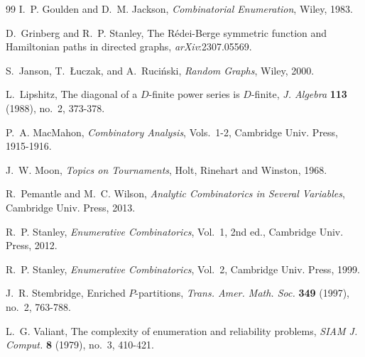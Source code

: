 \documentclass[12pt]{amsart}
\theoremstyle{definition}
\theoremstyle{remark}
\begin{document}
\begin{thebibliography}{99}
I.~P. Goulden and D.~M. Jackson,
\emph{Combinatorial Enumeration},
Wiley, 1983.

D.~Grinberg and R.~P. Stanley,
The R\'edei-Berge symmetric function and Hamiltonian paths in directed graphs,
\emph{arXiv}:2307.05569.

S.~Janson, T.~{\L}uczak, and A.~Ruci\'nski,
\emph{Random Graphs},
Wiley, 2000.

L.~Lipshitz,
The diagonal of a $D$-finite power series is $D$-finite,
\emph{J. Algebra} \textbf{113} (1988), no.~2, 373-378.

P.~A. MacMahon,
\emph{Combinatory Analysis}, Vols.~1-2,
Cambridge Univ. Press, 1915-1916.

J.~W. Moon,
\emph{Topics on Tournaments},
Holt, Rinehart and Winston, 1968.

R.~Pemantle and M.~C. Wilson,
\emph{Analytic Combinatorics in Several Variables},
Cambridge Univ. Press, 2013.

R.~P. Stanley,
\emph{Enumerative Combinatorics}, Vol.~1, 2nd ed.,
Cambridge Univ. Press, 2012.


R.~P. Stanley,
\emph{Enumerative Combinatorics}, Vol.~2,
Cambridge Univ. Press, 1999.

J.~R. Stembridge,
Enriched $P$-partitions,
\emph{Trans. Amer. Math. Soc.} \textbf{349} (1997), no.~2, 763-788.

L.~G. Valiant,
The complexity of enumeration and reliability problems,
\emph{SIAM J. Comput.} \textbf{8} (1979), no.~3, 410-421.

\end{thebibliography}
\end{document}
